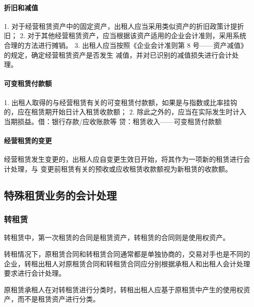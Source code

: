 \documentclass[UTF8,12pt]{ctexart}
\numberwithin{equation}{section} %
\numberwithin{figure}{section}
\numberwithin{table}{section}
\begin{document}
	\paragraph{折旧和减值}1.	对于经营租赁资产中的固定资产，出租人应当采用类似资产的折旧政策计提折旧；
	2.	对于其他经营租赁资产，应当根据该资产适用的企业会计准则，采用系统合理的方法进行摊销。
	3.	出租人应当按照《企业会计准则第 8 号——资产减值》的规定，确定经营租赁资产是否发生
	减值，并对已识别的减值损失进行会计处理。
	
	
	\paragraph{可变租赁付款额}1.	出租人取得的与经营租赁有关的可变租赁付款额，如果是与指数或比率挂钩的，应在租赁期开始日计入租赁收款额；
	2.	除此之外的，应当在实际发生时计入当期损益。借：银行存款/应收账款等
	贷：租赁收入——可变租赁付款额
	
	
	\paragraph{经营租赁的变更}经营租赁发生变更的，出租人应自变更生效日开始，将其作为一项新的租赁进行会计处理，与   变更前租赁有关的预收或应收租赁收款额视为新租赁的收款额。
	
	\subsection{特殊租赁业务的会计处理}
	\subsubsection{转租赁}
	转租赁中，第一次租赁的合同是租赁资产，转租赁的合同则是使用权资产。
	
	转租情况下，原租赁合同和转租赁合同通常都是单独协商的，交易对手也是不同的企业，转租出租人对原租赁合同和转租赁合同应分别根据承租人和出租人会计处理要求进行会计处理。
	
	原租赁承租人在对转租赁进行分类时，转租出租人应基于原租赁中产生的使用权资产，而不是租赁资产进行分类。
	
\end{document}
